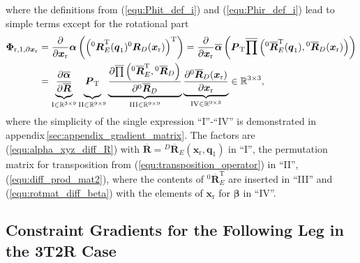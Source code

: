 \documentclass[robotics,article,submit,moreauthors,pdftex]{Definitions/mdpi}
\newcommand{\bm}[1]{\boldsymbol{#1}}
\newcommand{\rotmat}[2]{{{ }^{#1}\boldsymbol{R}}_{#2}}
\newcommand{\rotmato}[2]{{{ }^{#1}\boldsymbol{\overline{R}}}_{#2}}
\newcommand{\transp}[0]{{\mathrm{T}}}
\begin{document}
%
where the definitions from (\ref{equ:Phit_def_i}) and (\ref{equ:Phir_def_i}) lead to simple terms except for the rotational part
%
\begin{align}
\bm{\Phi}_{\mathrm{r},1,\partial\bm{x}_\mathrm{r}}
&=
\frac{\partial}{\partial \bm{x}_{\mathrm{r}}} \bm{\alpha}\left(\left(\rotmat{0}{E}^\transp(\bm{q}_1) \rotmat{0}{D}(\bm{x}_{\mathrm{r}})\right)^\transp\right) \label{equ:grad_Phi_1_x} 
=
\frac{\partial}{\partial \bm{x}_{\mathrm{r}}} \overline{\bm{\alpha}}\left(
\bm{P}_{\mathrm{T}}
\overline{\prod}\left( \rotmato{0}{E}^\transp(\bm{q}_1), \rotmato{0}{D}(\bm{x}_{\mathrm{r}})\right)\right) \\
&=
\underbrace{\vphantom{\frac{\partial \overline{\prod}\left( \rotmato{0}{E}^\transp, \rotmato{0}{D}\right)}{\partial \rotmato{0}{D}}}
    \frac{\partial \overline{\bm{\alpha}}}{\partial \overline{\bm{R}}}}_{\mathrm{I} \in {\mathbb{R}}^{3 \times 9}}
\underbrace{\vphantom{\frac{\partial \overline{\prod}\left( \rotmato{0}{E}^\transp, \rotmato{0}{D}\right)}{\partial \rotmato{0}{D}}}
    \bm{P}_{\mathrm{T}}}_{\mathrm{II} \in {\mathbb{R}}^{9 \times 9}}
\underbrace{\frac{\partial \overline{\prod}\left( \rotmato{0}{E}^\transp, \rotmato{0}{D}\right)}{\partial \rotmato{0}{D}}}_{\mathrm{III} \in {\mathbb{R}}^{9 \times 9}}
\underbrace{\frac{\partial \rotmato{0}{D}(\bm{x}_{\mathrm{r}})}{\partial \bm{x}_{\mathrm{r}}}}_{\mathrm{IV} \in {\mathbb{R}}^{9 \times 3}}
\in {\mathbb{R}}^{3 \times 3}, \nonumber
\end{align}
%
where the simplicity of the single expression ``I''-``IV'' is demonstrated in appendix\,\ref{sec:appendix_gradient_matrix}.
The factors are
(\ref{equ:alpha_xyz_diff_R}) with $\overline{\bm{R}}=\rotmato{D}{E}(\bm{x}_{\mathrm{r}},\bm{q}_1)$ in ``I'',
the permutation matrix for transposition from (\ref{equ:transposition_operator}) in ``II'',
(\ref{equ:diff_prod_mat2}), where the contents of $\rotmato{0}{E}^\transp$ are inserted in ``III'' and
(\ref{equ:rotmat_diff_beta}) with the elements of $\bm{x}_{\mathrm{r}}$ for $\bm{\beta}$ in ``IV''.

\subsection{Constraint Gradients for the Following Leg in the 3T2R Case}
\end{document}
